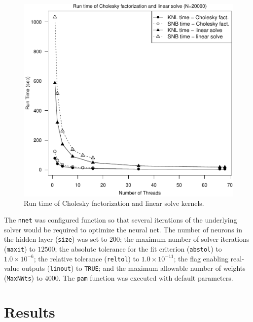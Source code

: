 \begin{figure}
\includegraphics[height=\columnwidth, width=\columnwidth]{chol_solve_20000_68-rt.pdf}
\caption{Run time of Cholesky factorization and linear solve kernels.}
\label{fig:cholSolveTime}
\end{figure}

The \texttt{nnet} was configured function so that several iterations of the underlying
solver would be required to optimize the neural net. The number of neurons in the hidden
layer (\texttt{size}) was set to $200$; the maximum number of solver iterations
(\texttt{maxit}) to $12500$; the absolute tolerance for the fit criterion
(\texttt{abstol}) to $1.0\times 10^{-6}$; the relative tolerance (\texttt{reltol}) to
$1.0\times 10^{-11}$; the flag enabling real-value outputs (\texttt{linout}) to
\texttt{TRUE}; and the maximum allowable number of weights (\texttt{MaxNWts}) to $4000$.
The \texttt{pam} function was executed with default parameters.

\section{Results} \label{sec:results}

